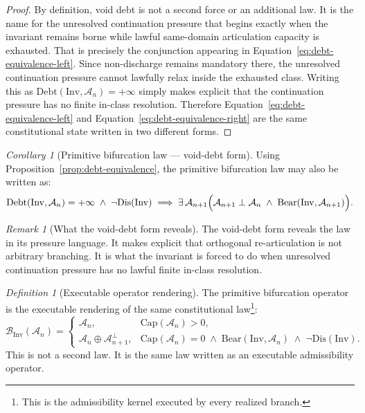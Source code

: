 \documentclass[11pt]{article}
\theoremstyle{definition}
\theoremstyle{plain}
\theoremstyle{remark}
\newtheorem{corollary}{Corollary}
\newtheorem{definition}{Definition}
\newtheorem{remark}{Remark}
\newcommand{\Inv}{\mathrm{Inv}}
\newcommand{\Bear}{\mathrm{Bear}}
\newcommand{\Dis}{\mathrm{Dis}}
\newcommand{\Debt}{\mathrm{Debt}}
\newcommand{\ArtCap}{\mathrm{Cap}}
\newcommand{\Aclass}{\mathcal{A}}
\newcommand{\BifOp}{\mathcal{B}}
\begin{document}
\begin{proof}
By definition, void debt is not a second force or an additional law. It is the name for the unresolved continuation pressure that begins exactly when the invariant remains borne while lawful same-domain articulation capacity is exhausted. That is precisely the conjunction appearing in Equation~\ref{eq:debt-equivalence-left}. Since non-discharge remains mandatory there, the unresolved continuation pressure cannot lawfully relax inside the exhausted class. Writing this as $\Debt(\Inv,\Aclass_n)=+\infty$ simply makes explicit that the continuation pressure has no finite in-class resolution. Therefore Equation~\ref{eq:debt-equivalence-left} and Equation~\ref{eq:debt-equivalence-right} are the same constitutional state written in two different forms.\end{proof}

\begin{corollary}[Primitive bifurcation law --- void-debt form]
\label{cor:debt-form}
Using Proposition~\ref{prop:debt-equivalence}, the primitive bifurcation law may also be written as:
\begin{equation}
\label{eq:debt-form}
\Debt(\Inv,\Aclass_n)=+\infty
\;\wedge\;
\neg\Dis(\Inv)
\;\Longrightarrow\;
\exists \, \Aclass_{n+1}
\Bigl(
\Aclass_{n+1}\perp \Aclass_n
\;\wedge\;
\Bear(\Inv,\Aclass_{n+1})
\Bigr).
\end{equation}
\end{corollary}

\begin{remark}[What the void-debt form reveals]
The void-debt form reveals the law in its pressure language. It makes explicit that orthogonal re-articulation is not arbitrary branching. It is what the invariant is forced to do when unresolved continuation pressure has no lawful finite in-class resolution.
\end{remark}

\begin{definition}[Executable operator rendering]
\label{def:operator-rendering}
The primitive bifurcation operator is the executable rendering of the same constitutional law\footnote{This is the admissibility kernel executed by every realized branch.}:
\begin{equation}
\label{eq:operator-form}
\BifOp_{\Inv}(\Aclass_n)=
\begin{cases}
\Aclass_n,
& \ArtCap(\Aclass_n)>0,\\[8pt]
\Aclass_n \oplus \Aclass_{n+1}^{\perp},
& \ArtCap(\Aclass_n)=0
\;\wedge\;
\Bear(\Inv,\Aclass_n)
\;\wedge\;
\neg\Dis(\Inv).
\end{cases}
\end{equation}
This is not a second law. It is the same law written as an executable admissibility operator.
\end{definition}
\end{document}
